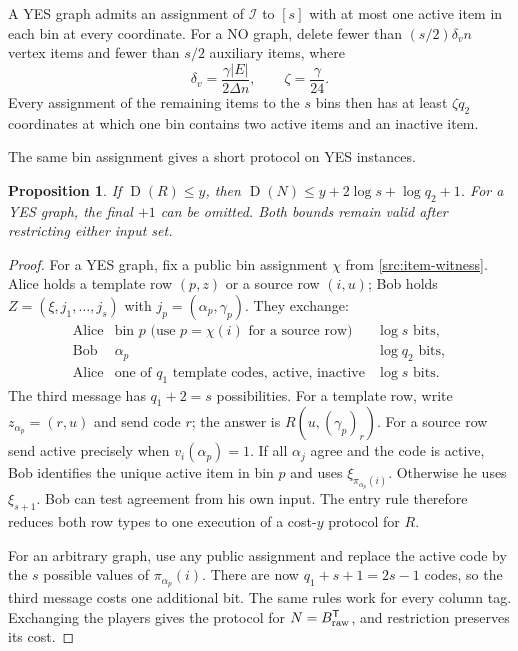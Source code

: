 \documentclass[11pt]{article} \usepackage[utf8]{inputenc}
\theoremstyle{plain} \newtheorem{theorem}{Theorem}[section]
\newtheorem{proposition}[proposition]{Proposition}
\theoremstyle{definition} \newaliascnt{definition}{theorem}
\newcommand{\D}{\operatorname{D}}
\begin{document}
\begin{lemma}
\label{src:item-witness}
A YES graph admits an assignment of \(\mathcal I\) to \([s]\) with at most one
active item in each bin at every coordinate. For a NO graph, delete fewer than
\((s/2)\delta_v n\) vertex items and fewer than \(s/2\) auxiliary items, where
\[
\delta_v=\frac{\gamma|E|}{2\Delta n},\qquad \zeta=\frac{\gamma}{24}.
\]
Every assignment of the remaining items to the \(s\) bins then has at least
\(\zeta q_2\) coordinates at which one bin contains two active items and an
inactive item.
\end{lemma}

The same bin assignment gives a short protocol on YES instances.

\begin{proposition}
\label{src:upper}
If \(\D(R)\le y\), then \(\D(N)\le y+2\log s+\log q_2+1\). For a YES graph, the
final \(+1\) can be omitted. Both bounds remain valid after restricting either
input set.
\end{proposition}

\begin{proof}
For a YES graph, fix a public bin assignment $\chi$ from
\cref{src:item-witness}. Alice holds a template row $(p,z)$ or a source row
$(i,u)$; Bob holds $Z=(\xi,j_1,\ldots,j_s)$ with
$j_p=(\alpha_p,\gamma_p)$. They exchange:
\[
\begin{array}{lll}
\text{Alice} & \text{bin }p\text{ (use }p=\chi(i)\text{ for a source row)}
  & \log s\text{ bits},\\
\text{Bob} & \alpha_p & \log q_2\text{ bits},\\
\text{Alice} & \text{one of }q_1\text{ template codes, active, inactive}
  & \log s\text{ bits}.
\end{array}
\]
The third message has $q_1+2=s$ possibilities. For a template row, write
$z_{\alpha_p}=(r,u)$ and send code $r$; the answer is
$R(u,(\gamma_p)_r)$. For a source row send active precisely when
$v_i(\alpha_p)=1$. If all $\alpha_j$ agree and the code is active, Bob
identifies the unique active item in bin $p$ and uses
$\xi_{\pi_{\alpha_p}(i)}$. Otherwise he uses $\xi_{s+1}$.
Bob can test agreement from his own input. The entry rule therefore reduces
both row types to one execution of a cost-$y$ protocol for $R$.

For an arbitrary graph, use any public assignment and replace the active
code by the $s$ possible values of $\pi_{\alpha_p}(i)$. There are now
$q_1+s+1=2s-1$ codes, so the third message costs one additional bit.
The same rules work for every column tag. Exchanging the players gives the
protocol for $N=B_{\rm raw}^{\mathsf T}$, and restriction preserves its cost.
\end{proof}
\end{document}
